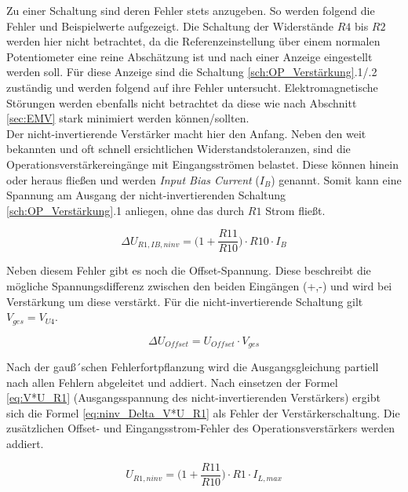 Zu einer Schaltung sind deren Fehler stets anzugeben.
So werden folgend die Fehler und Beispielwerte aufgezeigt.
Die Schaltung der Widerstände $R4$ bis $R2$ werden hier nicht betrachtet, da die Referenzeinstellung über einem \grqq normalen\grqq{} 
Potentiometer eine reine Abschätzung ist und nach einer Anzeige eingestellt werden soll.
Für diese Anzeige sind die Schaltung \ref{sch:OP_Verstärkung}.1/.2 zuständig und werden folgend auf 
ihre Fehler untersucht.
Elektromagnetische Störungen werden ebenfalls nicht betrachtet da diese wie nach Abschnitt \ref{sec:EMV} 
stark minimiert werden können/sollten.\\

Der nicht-invertierende Verstärker macht hier den Anfang.
Neben den weit bekannten und oft schnell ersichtlichen Widerstandstoleranzen, sind die Operationsverstärkereingänge mit 
Eingangsströmen belastet. Diese können hinein oder heraus fließen und werden \textit{Input Bias Current} ($I_{B}$) genannt.
Somit kann eine Spannung am Ausgang der nicht-invertierenden Schaltung \ref{sch:OP_Verstärkung}.1 anliegen, 
ohne das durch $R1$ Strom fließt.  

\begin{equation}
	\Delta U_{R1,IB,ninv} = \biggl(1 + \frac{R11}{R10}\biggr) \cdot R10 \cdot I_{B}
\end{equation}

Neben diesem Fehler gibt es noch die Offset-Spannung. Diese beschreibt die mögliche Spannungsdifferenz 
zwischen den beiden Eingängen (+,-) und wird bei Verstärkung um diese verstärkt. 
Für die nicht-invertierende Schaltung gilt $V_{ges} = V_{U4}$.

\begin{equation}
	\label{eq:Delta_UOffset}
	\Delta U_{Offset} = U_{Offset} \cdot V_{ges}
\end{equation}

Nach der gauß´schen Fehlerfortpflanzung wird die Ausgangsgleichung partiell nach allen Fehlern abgeleitet und addiert.
Nach einsetzen der Formel \ref{eq:V*U_R1} (Ausgangsspannung des nicht-invertierenden Verstärkers) 
ergibt sich die Formel \ref{eq:ninv_Delta_V*U_R1} als Fehler der Verstärkerschaltung. 
Die zusätzlichen Offset- und Eingangsstrom-Fehler des Operationsverstärkers werden addiert. 

\begin{equation}
	\label{eq:V*U_R1}
	U_{R1,ninv} = \biggl(1 + \frac{R11}{R10}\biggr) \cdot R1 \cdot I_{L,max}
\end{equation}

